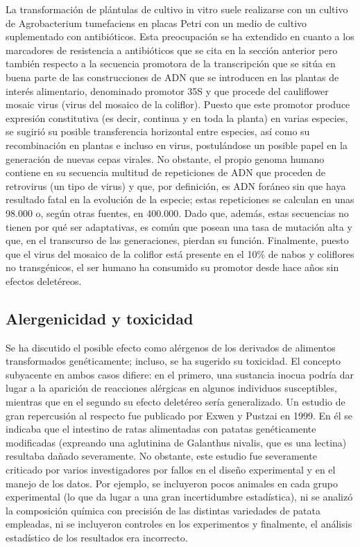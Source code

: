 \documentclass[11pt,a4paper]{article}
\begin{document}
La transformación de plántulas de cultivo in vitro suele realizarse con un cultivo de Agrobacterium tumefaciens en placas Petri con un medio de cultivo suplementado con antibióticos.
Esta preocupación se ha extendido en cuanto a los marcadores de resistencia a antibióticos que se cita en la sección anterior pero también respecto a la secuencia promotora de la transcripción que se sitúa en buena parte de las construcciones de ADN que se introducen en las plantas de interés alimentario, denominado promotor 35S y que procede del cauliflower mosaic virus (virus del mosaico de la coliflor). Puesto que este promotor produce expresión constitutiva (es decir, continua y en toda la planta) en varias especies, se sugirió su posible transferencia horizontal entre especies, así como su recombinación en plantas e incluso en virus, postulándose un posible papel en la generación de nuevas cepas virales.
No obstante, el propio genoma humano contiene en su secuencia multitud de repeticiones de ADN que proceden de retrovirus (un tipo de virus) y que, por definición, es ADN foráneo sin que haya resultado fatal en la evolución de la especie; estas repeticiones se calculan en unas 98.000
o, según otras fuentes, en 400.000.
Dado que, además, estas secuencias no tienen por qué ser adaptativas, es común que posean una tasa de mutación alta y que, en el transcurso de las generaciones, pierdan su función. Finalmente, puesto que el virus del mosaico de la coliflor está presente en el 10\% de nabos y coliflores no transgénicos, el ser humano ha consumido su promotor desde hace años sin efectos deletéreos.




\subsection{Alergenicidad y toxicidad}


Se ha discutido el posible efecto como alérgenos de los derivados de alimentos transformados genéticamente; incluso, se ha sugerido su toxicidad. El concepto subyacente en ambos casos difiere: en el primero, una sustancia inocua podría dar lugar a la aparición de reacciones alérgicas en algunos individuos susceptibles, mientras que en el segundo su efecto deletéreo sería generalizado. Un estudio de gran repercusión al respecto fue publicado por Exwen y Pustzai en 1999. En él se indicaba que el intestino de ratas alimentadas con patatas genéticamente modificadas (expreando una aglutinina de Galanthus nivalis, que es una lectina) resultaba dañado severamente. 
No obstante, este estudio fue severamente criticado por varios investigadores por fallos en el diseño experimental y en el manejo de los datos. Por ejemplo, se incluyeron pocos animales en cada grupo experimental (lo que da lugar a una gran incertidumbre estadística), ni se analizó la composición química con precisión de las distintas variedades de patata empleadas, ni se incluyeron controles en los experimentos y finalmente, el análisis estadístico de los resultados era incorrecto.
\end{document}

